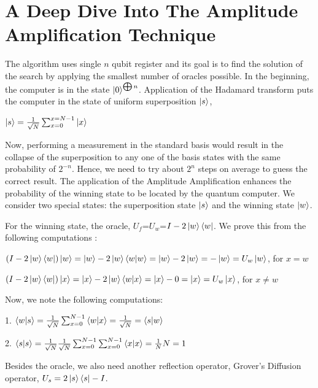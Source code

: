 \documentclass{article}
\begin{document}
\section{A Deep Dive Into The Amplitude Amplification Technique}
The algorithm uses single $n$ qubit register and its goal is to find the solution of the search by applying the smallest number of oracles possible. In the beginning, the computer is in the state $\ket{0}^{\bigoplus n}$. Application of the Hadamard transform puts the computer in the state of uniform superposition $\ket{s}$,
\begin{center}
$\ket{s} = {1 \over \sqrt{N}} \sum_{x=0}^{x=N-1} \ket{x}$
\end{center}
Now, performing a measurement in the standard basis would result in the collapse of the superposition to any one of the basis states with the same probability of $2^{-n}$. Hence, we need to try about $2^n$ steps on average to guess the correct result. The application of the Amplitude Amplification enhances the probability of the winning state to be located by the quantum computer. We consider two special states: the superposition state $\ket{s}$ and the winning state $\ket{w}$.\par
For the winning state, the oracle, $U_f$=$U_w$=$I-2 \ket{w} \bra{w}$. We prove this from the following computations :
\begin{center}
$(I-2 \ket{w} \bra{w}) \ket{w}=\ket{w}-2\ket{w}\braket{w|w}=\ket{w}-2\ket{w}=-\ket{w}={U_w}\ket{w}$, for $x=w$ \par
$(I-2 \ket{w} \bra{w}) \ket{x}=\ket{x}-2\ket{w}\braket{w|x}=\ket{x}-0=\ket{x}={U_w}\ket{x}$, for $x \ne w$
\end{center}
Now, we note the following computations:
\begin{center}
1. $\braket{w|s}={1 \over \sqrt{N}}\sum_{x=0}^{N-1} \braket{w|x}={1 \over \sqrt{N}}=\braket{s|w}$ \par
2. $\braket{s|s}={1 \over \sqrt{N}} {1 \over \sqrt{N}}\sum_{x=0}^{N-1}\sum_{x=0}^{N-1} \braket{x|x}={1 \over N}N=1$
\end{center}
Besides the oracle, we also need another reflection operator, Grover's Diffusion operator, $U_s=2\ket{s}\bra{s}-I$.
\end{document}
